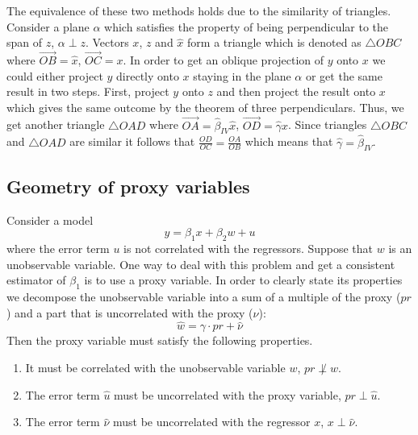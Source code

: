 The equivalence of these two methods holds due to the similarity of triangles.
Consider a plane $\alpha$ which satisfies the property of being perpendicular
to the span of $z$, $\alpha \perp z$.
Vectors $x$, $z$ and $\hat x$ form a triangle which is denoted as $\bigtriangleup OBC$
where $\overrightarrow{OB} = \hat{x}$, $\overrightarrow{OC} = x$.
In order to get an oblique projection of $y$ onto $x$ we could either
project $y$ directly onto $x$ staying in the plane $\alpha$
or get the same result in two steps. First, project $y$ onto $z$
and then project the result onto $x$ which gives the same outcome
by the theorem of three perpendiculars. Thus, we get another triangle $\bigtriangleup OAD$
where $\overrightarrow{OA} = \hat \beta_{IV} \hat x$, $\overrightarrow{OD} = \hat \gamma x$.
Since triangles $\bigtriangleup OBC$ and $\bigtriangleup OAD$ are similar
it follows that $\frac{OD}{OC} = \frac{OA}{OB}$ which means that $\hat \gamma = \hat \beta_{IV}$.


\subsection{Geometry of proxy variables}

Consider a model
\[
y = \beta_1 x + \beta_2 w + u
\]
where the error term $u$ is not correlated with the regressors.
Suppose that $w$ is an unobservable variable.
One way to deal with this problem and get a consistent estimator of $\beta_1$ is to use a proxy variable.
In order to clearly state its properties we decompose the unobservable variable
into a sum of a multiple of the proxy ($pr$) and a part that is uncorrelated
with the proxy ($\hat \nu$):
\[
\hat w = \gamma \cdot pr + \hat \nu
\]
Then the proxy variable must satisfy the following properties.
\begin{enumerate}
  \item It must be correlated with the unobservable variable $w$, $pr \not\perp w$.
  \item The error term $\hat u$ must be uncorrelated with the proxy variable, $pr \perp \hat u$.
  \item The error term $\hat \nu$ must be uncorrelated with the regressor $x$, $x \perp \hat \nu$.
\end{enumerate}

